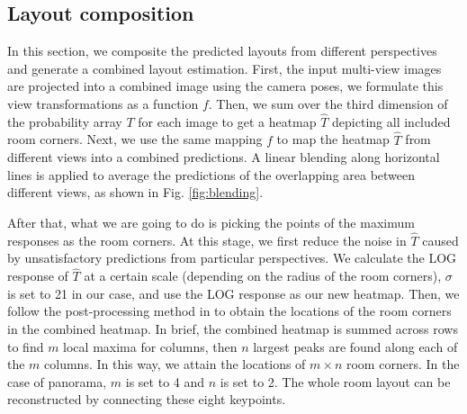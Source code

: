 


\subsection{Layout composition}
\label{sec:merging}
In this section, we composite the predicted layouts from different perspectives and generate a combined layout estimation. First, the input multi-view images are projected into a combined image using the camera poses, we formulate this view transformations as a function $f$. Then, we sum over the third dimension of the probability array $T$ for each image to get a heatmap $\hat{T}$ depicting all included room corners. Next, we use the same mapping $f$ to map the heatmap $\hat{T}$ from different views into a combined predictions. A linear blending along horizontal lines is applied to average the predictions of the overlapping area between different views, as shown in Fig. \ref{fig:blending}. 

%
After that, what we are going to do is picking the points of the maximum responses as the room corners. At this stage, we first reduce the noise in $\hat{T}$ caused by unsatisfactory predictions from particular perspectives. We calculate the LOG response of $\hat{T}$ at a certain scale (depending on the radius of the room corners), $\sigma$ is set to 21 in our case, and use the LOG response as our new heatmap.
%
Then, we follow the post-processing method in \cite{zou2018layoutnet} to obtain the locations of the room corners in the combined heatmap. In brief, the combined heatmap is summed across rows to find $m$ local maxima for columns, then $n$ largest peaks are found along each of the $m$ columns. In this way, we attain the locations of $m \times n$ room corners. In the case of panorama, $m$ is set to 4 and $n$ is set to 2. The whole room layout can be reconstructed by connecting these eight keypoints. 

